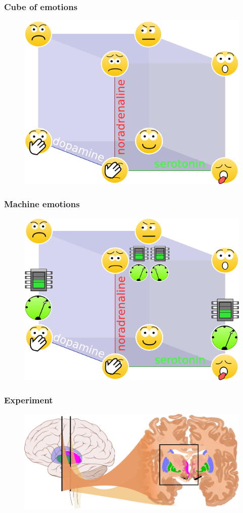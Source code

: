 \documentclass[12pt, aspectratio=169]{beamer}
\begin{document}
\begin{frame}
\frametitle{Cube of emotions}
\begin{figure}
\includegraphics[width=0.6\linewidth]{cube_of_emotional_parameters}
\end{figure}
\end{frame}



\begin{frame}
\frametitle{Machine emotions}
\begin{figure}
\includegraphics[width=0.6\linewidth]{cube_of_emotional_parameters_machine}
\end{figure}
\end{frame}



\begin{frame}
\frametitle{Experiment}
\begin{figure}
\includegraphics[width=1.0\linewidth]{Basal_ganglia_circuits_cropped}
\end{figure}
\end{frame}
\end{document}
